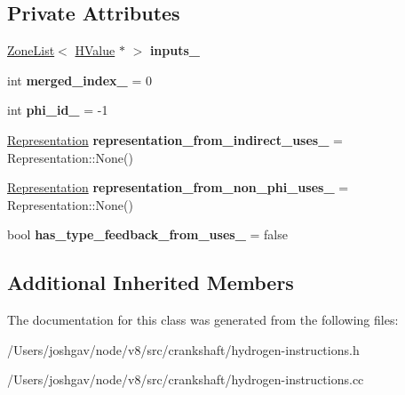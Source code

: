 \subsection*{Private Attributes}
\begin{DoxyCompactItemize}
\item 
\hyperlink{classv8_1_1internal_1_1_zone_list}{Zone\+List}$<$ \hyperlink{classv8_1_1internal_1_1_h_value}{H\+Value} $\ast$ $>$ {\bfseries inputs\+\_\+}\hypertarget{classv8_1_1internal_1_1_h_phi_a7d3d68075d5992be7a8542c45fb60bfe}{}\label{classv8_1_1internal_1_1_h_phi_a7d3d68075d5992be7a8542c45fb60bfe}

\item 
int {\bfseries merged\+\_\+index\+\_\+} = 0\hypertarget{classv8_1_1internal_1_1_h_phi_a77ed034689479f510d3eac0251908d9c}{}\label{classv8_1_1internal_1_1_h_phi_a77ed034689479f510d3eac0251908d9c}

\item 
int {\bfseries phi\+\_\+id\+\_\+} = -\/1\hypertarget{classv8_1_1internal_1_1_h_phi_a023995ed030756aaf6d142844e3fc585}{}\label{classv8_1_1internal_1_1_h_phi_a023995ed030756aaf6d142844e3fc585}

\item 
\hyperlink{classv8_1_1internal_1_1_representation}{Representation} {\bfseries representation\+\_\+from\+\_\+indirect\+\_\+uses\+\_\+} = Representation\+::\+None()\hypertarget{classv8_1_1internal_1_1_h_phi_a403c11c75886c8a05b16ff30a9ed243f}{}\label{classv8_1_1internal_1_1_h_phi_a403c11c75886c8a05b16ff30a9ed243f}

\item 
\hyperlink{classv8_1_1internal_1_1_representation}{Representation} {\bfseries representation\+\_\+from\+\_\+non\+\_\+phi\+\_\+uses\+\_\+} = Representation\+::\+None()\hypertarget{classv8_1_1internal_1_1_h_phi_afd0cfcda2e7bb5b14d76708953291e57}{}\label{classv8_1_1internal_1_1_h_phi_afd0cfcda2e7bb5b14d76708953291e57}

\item 
bool {\bfseries has\+\_\+type\+\_\+feedback\+\_\+from\+\_\+uses\+\_\+} = false\hypertarget{classv8_1_1internal_1_1_h_phi_a493985d5400f725ef539fc0fbd18d05d}{}\label{classv8_1_1internal_1_1_h_phi_a493985d5400f725ef539fc0fbd18d05d}

\end{DoxyCompactItemize}
\subsection*{Additional Inherited Members}


The documentation for this class was generated from the following files\+:\begin{DoxyCompactItemize}
\item 
/\+Users/joshgav/node/v8/src/crankshaft/hydrogen-\/instructions.\+h\item 
/\+Users/joshgav/node/v8/src/crankshaft/hydrogen-\/instructions.\+cc\end{DoxyCompactItemize}
